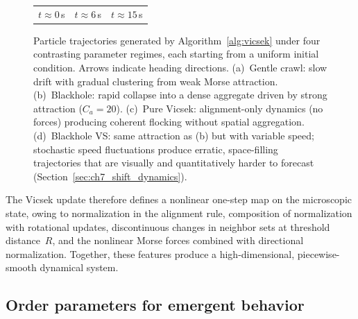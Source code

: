 \begin{figure}[htbp]
{\begin{tabular}{@{}c@{\;}c@{\;}c@{}}
  {\small $t \approx 0$\,s} & {\small $t \approx 6$\,s} & {\small $t \approx 15$\,s}
\end{tabular}}

\caption{Particle trajectories generated by Algorithm~\ref{alg:vicsek} under
  four contrasting parameter regimes, each starting from a uniform initial
  condition.  Arrows indicate heading directions.
  (a)~Gentle crawl: slow drift with gradual clustering from weak Morse
  attraction.
  (b)~Blackhole: rapid collapse into a dense aggregate driven by strong
  attraction ($C_a{=}20$).
  (c)~Pure Vicsek: alignment-only dynamics (no forces) producing coherent
  flocking without spatial aggregation.
  (d)~Blackhole VS: same attraction as (b) but with variable speed;
  stochastic speed fluctuations produce erratic, space-filling trajectories
  that are visually and quantitatively harder to forecast
  (Section~\ref{sec:ch7_shift_dynamics}).}
\label{fig:trajectory_snapshots}
\end{figure}

The Vicsek update therefore defines a nonlinear one-step map on the microscopic state, owing to normalization in the alignment rule, composition of normalization with rotational updates, discontinuous changes in neighbor sets at threshold distance~$R$, and the nonlinear Morse forces combined with directional normalization.  Together, these features produce a high-dimensional, piecewise-smooth dynamical system.

\subsection{Order parameters for emergent behavior}
\label{sec:order_parameters}

